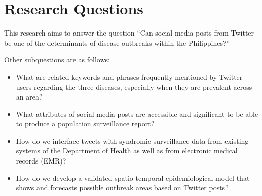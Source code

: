 \section{Research Questions}

This research aims to answer the question ``Can social media posts from Twitter be one of the determinants of disease outbreaks within the Philippines?''

Other subquestions are as follows:
\begin{itemize}
\item What are related keywords and phrases frequently mentioned by Twitter users regarding the three diseases, especially when they are prevalent across an area?
\item What attributes of social media posts are accessible and significant to be able to produce a population surveillance report?
\item How do we interface tweets with syndromic surveillance data from existing systems of the Department of Health as well as from electronic medical records (EMR)?
\item How do we develop a validated spatio-temporal epidemiological model that shows and forecasts possible outbreak areas based on Twitter posts?
\end{itemize}